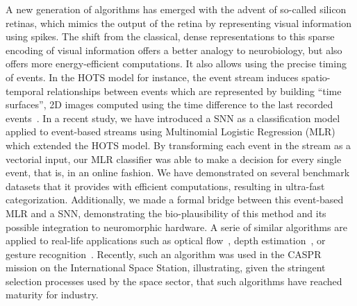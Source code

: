 \documentclass[default]{sn-jnl}%
\theoremstyle{thmstyleone}%
\theoremstyle{thmstyletwo}%
\theoremstyle{thmstylethree}%
\begin{document}
A new generation of algorithms has emerged with the advent of so-called silicon retinas, which mimics the output of the retina by representing visual information using spikes. %
The shift from the classical, dense representations to this sparse encoding of visual information offers a better analogy to neurobiology, but also offers more energy-efficient computations. It also allows using the precise timing of events. In the HOTS model for instance, the event stream induces spatio-temporal relationships between events which are represented by building ``time surfaces'', 2D images computed using the time difference to the last recorded events~\citep{lagorce_hots_2017}. In a recent study, we have introduced a SNN as a classification model applied to event-based streams using Multinomial Logistic Regression (MLR)~\citep{grimaldi_robust_2022} which extended the HOTS model. By transforming each event in the stream as a vectorial input, our MLR classifier was able to make a decision for every single event, that is, in an online fashion. We have demonstrated on several benchmark datasets that it provides with efficient computations, resulting in ultra-fast categorization. Additionally, we made a formal bridge between this event-based MLR and a SNN, demonstrating the bio-plausibility of this method and its possible integration to neuromorphic hardware. A serie of similar algorithms are applied to real-life applications such as optical flow~\citep{benosman_asynchronous_2012}, depth estimation~\citep{dardelet_event-by-event_2021}, or gesture recognition~\citep{maro_event-based_2020}. Recently, such an algorithm was used in the CASPR mission on the International Space Station, illustrating, given the stringent selection processes used by the space sector, that such algorithms have reached maturity for industry.
\end{document}
